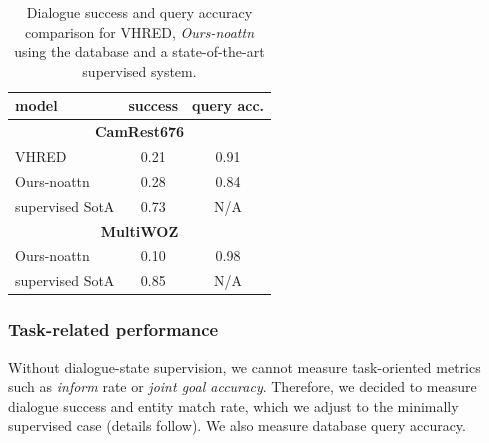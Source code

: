 \begin{table}[t]
    \centering\small
    \begin{tabular}{lcc}
      \toprule
      model &  success & query acc.\hspace{-2mm} \\
      \midrule
      \multicolumn{3}{c}{\textbf{CamRest676}} \\
      \midrule
      VHRED & 0.21 & 0.91 \\
      Ours-noattn & 0.28 & 0.84 \\\hdashline[0.5pt/2pt]
      supervised SotA \cite{peng2021soloist}\hspace{-2mm} & 0.73 & N/A \\
      \midrule
      \multicolumn{3}{c}{\textbf{MultiWOZ}} \\
      \midrule
      Ours-noattn & 0.10 & 0.98 \\\hdashline[0.5pt/2pt]
      supervised SotA \cite{peng2021soloist}\hspace{-2mm} & 0.85 & N/A \\
      \bottomrule
  \end{tabular}
  \caption{Dialogue success and query accuracy comparison for VHRED, \emph{Ours-noattn} using the database and a state-of-the-art supervised system.}
  \label{tab:success}
\end{table}

\subsubsection{Task-related performance}
\label{05:sec:succ}
Without dialogue-state supervision, we cannot measure task-oriented metrics such as \emph{inform} rate or \emph{joint goal accuracy}.
Therefore, we decided to measure dialogue success and entity match rate, which we adjust to the minimally supervised case (details follow). We also measure database query accuracy.

